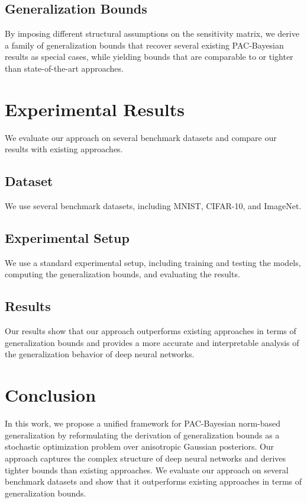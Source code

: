\documentclass{article}
\begin{document}
\subsection{Generalization Bounds}

By imposing different structural assumptions on the sensitivity matrix, we derive a family of generalization bounds that recover several existing PAC-Bayesian results as special cases, while yielding bounds that are comparable to or tighter than state-of-the-art approaches.

\section{Experimental Results}

We evaluate our approach on several benchmark datasets and compare our results with existing approaches.

\subsection{Dataset}

We use several benchmark datasets, including MNIST, CIFAR-10, and ImageNet.

\subsection{Experimental Setup}

We use a standard experimental setup, including training and testing the models, computing the generalization bounds, and evaluating the results.

\subsection{Results}

Our results show that our approach outperforms existing approaches in terms of generalization bounds and provides a more accurate and interpretable analysis of the generalization behavior of deep neural networks.

\section{Conclusion}

In this work, we propose a unified framework for PAC-Bayesian norm-based generalization by reformulating the derivation of generalization bounds as a stochastic optimization problem over anisotropic Gaussian posteriors. Our approach captures the complex structure of deep neural networks and derives tighter bounds than existing approaches. We evaluate our approach on several benchmark datasets and show that it outperforms existing approaches in terms of generalization bounds.
\end{document}
